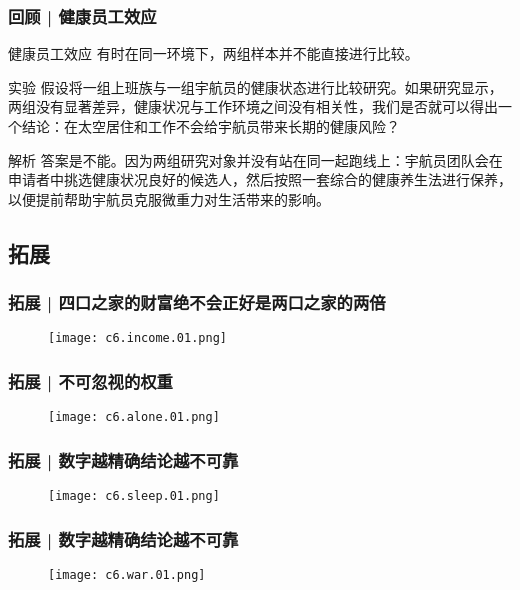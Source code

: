 \begin{frame}
  \frametitle{回顾 | 健康员工效应}
  \begin{block}{健康员工效应}
    有时在同一环境下，两组样本并不能直接进行比较。
  \end{block}
  \pause
  \begin{block}{实验}
假设将一组上班族与一组宇航员的健康状态进行比较研究。如果研究显示，两组没有显著差异，健康状况与工作环境之间没有相关性，我们是否就可以得出一个结论：在太空居住和工作不会给宇航员带来长期的健康风险？
  \end{block}
  \pause \pause \pause \pause
  \begin{block}{解析}
答案是不能。因为两组研究对象并没有站在同一起跑线上：宇航员团队会在申请者中挑选健康状况良好的候选人，然后按照一套综合的健康养生法进行保养，以便提前帮助宇航员克服微重力对生活带来的影响。
  \end{block}
\end{frame}

\subsection{拓展}
\begin{frame}
  \frametitle{拓展 | 四口之家的财富绝不会正好是两口之家的两倍}
  \begin{figure}
    \centering
    \texttt{[image: c6.income.01.png]}
  \end{figure}
\end{frame}

\begin{frame}
  \frametitle{拓展 | 不可忽视的权重}
  \begin{figure}
    \centering
    \texttt{[image: c6.alone.01.png]}
  \end{figure}
\end{frame}

\begin{frame}
  \frametitle{拓展 | 数字越精确结论越不可靠}
  \begin{figure}
    \centering
    \texttt{[image: c6.sleep.01.png]}
  \end{figure}
\end{frame}

\begin{frame}
  \frametitle{拓展 | 数字越精确结论越不可靠}
  \begin{figure}
    \centering
    \texttt{[image: c6.war.01.png]}
  \end{figure}
\end{frame}

